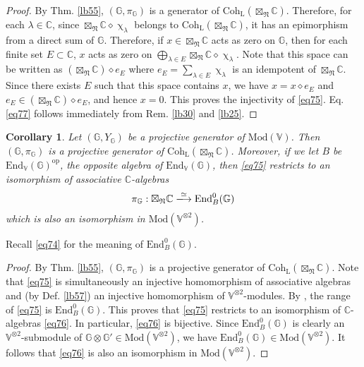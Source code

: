 \documentclass[11pt,b5paper,notitlepage]{article}
\theoremstyle{definition}
\theoremstyle{plain}
\newtheorem{co}[df]{Corollary}
\newcommand{\End}{\mathrm{End}} %
\newcommand{\opp}{\mathrm{op}}
\newcommand{\SLF}{\mathrm{SLF}}
\newcommand{\Vbb}{\mathbb V}
\newcommand{\Gbb}{\mathbb G}
\newcommand{\Cbb}{\mathbb C}
\newcommand{\<}{\left\langle}
\renewcommand{\>}{\right\rangle}
\newcommand{\Mod}{\mathrm{Mod}}
\newcommand{\fn}{\mathfrak{N}}
\newcommand{\Coh}{{\mathrm{Coh}_{\mathrm L}}}
\numberwithin{equation}{section}
\begin{document}



\begin{proof}
By Thm. \ref{lb55}, $(\Gbb,\pi_\Gbb)$ is a generator of $\Coh(\boxtimes_\fn\Cbb)$. Therefore, for each $\lambda\in\Cbb$, since $\boxtimes_\fn\Cbb\diamond\upchi_\lambda$ belongs to $\Coh(\boxtimes_\fn\Cbb)$, it has an epimorphism from a direct sum of $\Gbb$. Therefore, if $x\in\boxtimes_\fn\Cbb$ acts as zero on $\Gbb$, then for each finite set $E\subset\Cbb$, $x$ acts as zero on $\bigoplus_{\lambda\in E}\boxtimes_\fn\Cbb\diamond\upchi_\lambda$. Note that this space can be written as $(\boxtimes_\fn\Cbb)\diamond e_E$ where $e_E=\sum_{\lambda\in E}\upchi_\lambda$ is an idempotent of $\boxtimes_\fn\Cbb$. Since there exists $E$ such that this space contains $x$, we have $x=x\diamond e_E$ and $e_E\in(\boxtimes_\fn\Cbb)\diamond e_E$, and hence $x=0$. This proves the injectivity of \eqref{eq75}. Eq. \eqref{eq77} follows immediately from Rem. \ref{lb30} and \ref{lb25}.
\end{proof}



\begin{co}\label{lb56}
Let $(\Gbb,Y_\Gbb)$ be a projective generator of $\Mod(\Vbb)$. Then $(\Gbb,\pi_\Gbb)$ is a projective generator of $\Coh(\boxtimes_\fn\Cbb)$. Moreover, if we let $B$ be $\End_\Vbb(\Gbb)^\opp$, the opposite algebra of $\End_\Vbb(\Gbb)$, then \eqref{eq75} restricts to an isomorphism of associative $\Cbb$-algebras
\begin{align}\label{eq76}
\pi_\Gbb:\boxtimes_\fn\Cbb\xlongrightarrow{\simeq} \End_B^0(\Gbb)
\end{align}
which is also an isomorphism in $\Mod(\Vbb^{\otimes 2})$. 
\end{co}

Recall \eqref{eq74} for the meaning of $\End_B^0(\Gbb)$.



\begin{proof}
By Thm. \ref{lb55}, $(\Gbb,\pi_\Gbb)$ is a projective generator of $\Coh(\boxtimes_\fn\Cbb)$. Note that \eqref{eq75} is simultaneously an injective homomorphism of associative algebras and (by Def. \ref{lb57}) an injective homomorphism of $\Vbb^{\otimes 2}$-modules. By \cite[Thm. 11.7]{GZ4}, the range of \eqref{eq75} is $\End_B^0(\Gbb)$. This proves that \eqref{eq75} restricts to an isomorphism of $\Cbb$-algebras \eqref{eq76}. In particular, \eqref{eq76} is bijective. Since $\End_B^0(\Gbb)$ is clearly an $\Vbb^{\otimes 2}$-submodule of $\Gbb\otimes\Gbb'\in\Mod(\Vbb^{\otimes 2})$, we have $\End_B^0(\Gbb)\in\Mod(\Vbb^{\otimes 2})$. It follows that \eqref{eq76} is also an isomorphism in $\Mod(\Vbb^{\otimes 2})$.
\end{proof}
\end{document}
